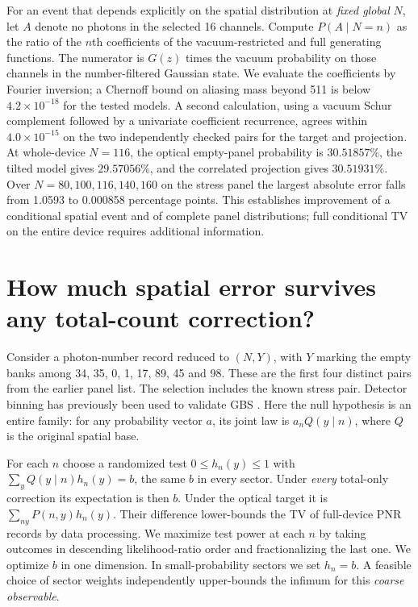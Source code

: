 \documentclass[11pt]{article}
\begin{document}
For an event that depends explicitly on the spatial distribution at \emph{fixed global} $N$, let $A$ denote no photons in the selected 16 channels. Compute $P(A\mid N=n)$ as the ratio of the $n$th coefficients of the vacuum-restricted and full generating functions. The numerator is $G(z)$ times the vacuum probability on those channels in the number-filtered Gaussian state. We evaluate the coefficients by Fourier inversion; a Chernoff bound on aliasing mass beyond 511 is below $4.2\times10^{-18}$ for the tested models. A second calculation, using a vacuum Schur complement followed by a univariate coefficient recurrence, agrees within $4.0\times10^{-15}$ on the two independently checked pairs for the target and projection. At whole-device $N=116$, the optical empty-panel probability is $30.51857\%$, the tilted model gives $29.57056\%$, and the correlated projection gives $30.51931\%$. Over $N=80,100,116,140,160$ on the stress panel the largest absolute error falls from 1.0593 to 0.000858 percentage points. This establishes improvement of a conditional spatial event and of complete panel distributions; full conditional TV on the entire device requires additional information.

\section{How much spatial error survives any total-count correction?}
Consider a photon-number record reduced to $(N,Y)$, with $Y$ marking the empty banks among 34, 35, 0, 1, 17, 89, 45 and 98. These are the first four distinct pairs from the earlier panel list. The selection includes the known stress pair. Detector binning has previously been used to validate GBS \cite{binning}. Here the null hypothesis is an entire family: for any probability vector $a$, its joint law is $a_n Q(y\mid n)$, where $Q$ is the original spatial base.

For each $n$ choose a randomized test $0\le h_n(y)\le1$ with $\sum_y Q(y\mid n)h_n(y)=b$, the same $b$ in every sector. Under \emph{every} total-only correction its expectation is then $b$. Under the optical target it is $\sum_{ny}P(n,y)h_n(y)$. Their difference lower-bounds the TV of full-device PNR records by data processing. We maximize test power at each $n$ by taking outcomes in descending likelihood-ratio order and fractionalizing the last one. We optimize $b$ in one dimension. In small-probability sectors we set $h_n=b$. A feasible choice of sector weights independently upper-bounds the infimum for this \emph{coarse observable}.
\end{document}
